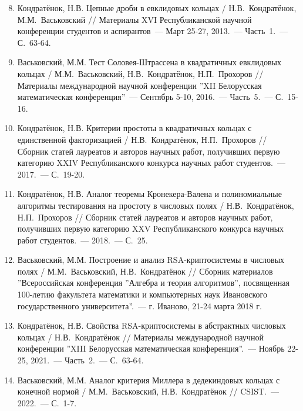 \documentclass[_00_dissertation.tex]{subfiles}
\begin{document}
\begin{enumerate}
\setcounter{enumi}{7}

    \item \label{source:Republican_Scientific_Conference_of_Students_and_Postgraduates_2013}
    Кондратёнок, Н.В. Цепные дроби в евклидовых кольцах / Н.В.~Кондратёнок, М.М.~Васьковский // Материалы XVI Республиканской научной конференции студентов и аспирантов~--- Март 25-27, 2013.~--- Часть~1.~--- С.~63-64.

    \item \label{source:XII_Belarussian_math_conference_2016}
    Васьковский, М.М. Тест Соловея-Штрассена в квадратичных евклидовых кольцах / М.М.~Васьковский, Н.В.~Кондратёнок, Н.П.~Прохоров // Материалы международной научной конференции ''XII Белорусская математическая конференция''~--- Сентябрь 5-10, 2016.~--- Часть~5.~--- С.~15-16.

    \item \label{source:Collection_of_articles_by_laureates_2017}
    Кондратёнок, Н.В. Критерии простоты в квадратичных кольцах с единственной факторизацией / Н.В.~Кондратёнок, Н.П.~Прохоров // Сборник статей лауреатов и авторов научных работ, получивших первую категорию XXIV Республиканского конкурса научных работ студентов.~--- 2017.~--- С.~19-20.

    \item \label{source:Collection_of_articles_by_laureates_2018}
    Кондратёнок, Н.В. Аналог теоремы Кронекера-Валена и полиномиальные алгоритмы тестирования на простоту в числовых полях / Н.В.~Кондратёнок, Н.П.~Прохоров // Сборник статей лауреатов и авторов научных работ, получивших первую категорию XXV Республиканского конкурса научных работ студентов.~--- 2018.~--- С.~25.

    \item \label{source:Algebra_and_theory_of_algorithms}
    Васьковский, М.М. Построение и анализ RSA-криптосистемы в числовых полях / М.М.~Васьковский, Н.В.~Кондратёнок // Сборник материалов ''Всероссийская конференция ''Алгебра и теория алгоритмов'', посвященная 100-летию факультета математики и компьютерных наук Ивановского государственного университета''.~--- г. Иваново, 21-24 марта 2018 г.

    \item \label{source:XIII_Belarussian_math_conference_2021}
    Кондратёнок, Н.В. Свойства RSA-криптосистемы в абстрактных числовых кольцах / Н.В.~Кондратёнок // Материалы международной научной конференции ''XIII Белорусская математическая конференция''.~--- Ноябрь 22-25, 2021.~--- Часть~2.~--- С.~63-64.

    \item \label{source:CSIST_2022}
    Васьковский, М.М. Аналог критерия Миллера в дедекиндовых кольцах с конечной нормой / М.М.~Васьковский, Н.В.~Кондратёнок // CSIST.~--- 2022.~--- С.~1-7.

\end{enumerate}

\end{document}
